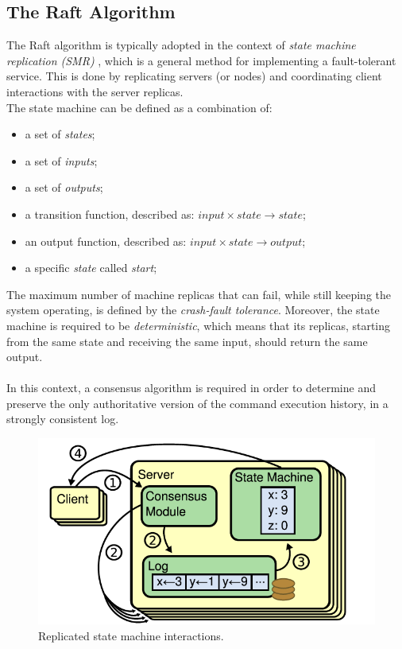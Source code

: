 \subsection{The Raft Algorithm}
The Raft algorithm is typically adopted in the context of \textit{state machine replication (SMR)} \cite{site:state-machine-replication-wiki}, which is a general method for implementing a fault-tolerant service. This is done by replicating servers (or nodes) and coordinating client interactions with the server replicas. \\
The state machine can be defined as a combination of:
\begin{itemize}
	\item a set of \textit{states};
	\item a set of \textit{inputs};
	\item a set of \textit{outputs};
	\item a transition function, described as: $input \times state \rightarrow state$; 
	\item an output function, described as: $input \times state \rightarrow output$;
	\item a specific \textit{state} called \textit{start};
\end{itemize}
The maximum number of machine replicas that can fail, while still keeping the system operating, is defined by the \textit{crash-fault tolerance}. Moreover, the state machine is required to be \textit{deterministic}, which means that its replicas, starting from the same state and receiving the same input, should return the same output. \\ \\
In this context, a consensus algorithm is required in order to determine and preserve the only authoritative version of the command execution history, in a strongly consistent log.
\begin{figure}[h!]
	\centering
	\includegraphics[width=0.7\linewidth]{"immagini/Technologies/image5.png"}
	\caption{Replicated state machine interactions.}
	\label{fig:states}
\end{figure}
